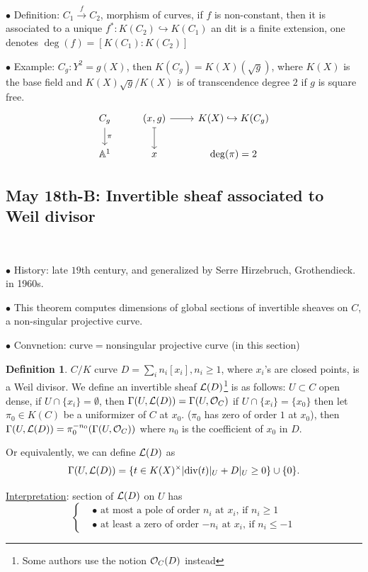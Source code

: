 \documentclass[11pt]{article}
\theoremstyle{definition}
\newtheorem{dfn}[thm]{Definition}
\newcommand{\affn}{\mathbb A}
\newcommand{\call}{{\cal L}}
\newcommand{\calo}{{\cal O}}
\renewcommand{\div}{\textnormal{div}}
\newcommand{\lrta}{\longrightarrow}
\newcommand{\inj}{\hookrightarrow}
\begin{document}
$\bullet$ Definition: $C_1\overset{f}{\lrta}{C_2}$, morphism of curves, if $f$ is non-constant, then it is associated to a unique $f^*:K(C_2)\inj K(C_1)$ an dit is a finite extension, one denotes $\deg(f)=[K(C_1):K(C_2)]$

$\bullet$ Example: $C_g:Y^2=g(X)$, then $K(C_g)=K(X)(\sqrt{g})$, where $K(X)$ is the base field and $K(X)\sqrt{g}/K(X)$ is of transcendence degree $2$ if $g$ is square free.
$$
\begin{tikzcd}
C_g \arrow[d, "\pi"] & {(x,g)} \arrow[d, maps to] \arrow[r] & K(X)\inj K(C_g) \\
\affn^1 & x & \deg(\pi)=2
\end{tikzcd}
$$
\subsection{May 18th-B: Invertible sheaf associated to Weil divisor}
\ 

$\bullet$ History: late $19$th century, and generalized by Serre Hirzebruch, Grothendieck. in 1960s.

$\bullet$ This theorem computes dimensions of global sections of invertible sheaves on $C$, a non-singular projective curve.

$\bullet$ Convnetion: curve$=$nonsingular projective curve (in this section)
\begin{dfn} $C/K$ curve $D=\sum_i n_i [x_i], n_i\geq 1$, where $x_i$'s are closed points,  is a Weil divisor.  We define an  invertible sheaf $\call(D)$\footnote{Some authors use the notion $\calo_C(D)$ instead} is as follows:
$U\subset C$ open dense, if $U\cap \{x_i\}=\emptyset$, then $\Gamma(U,\call(D))=\Gamma(U,\calo_C)$ if $U\cap \{x_i\}=\{x_0\}$ then let $\pi_0\in K(C)$  be a uniformizer of $C$ at $x_0$.  ($\pi_0$ has zero of order $1$ at $x_0$), then $\Gamma(U,\call(D))=\pi_0^{-n_0}(\Gamma(U,\calo_C))$ where $n_0$ is the coefficient of $x_0$ in $D$.

Or equivalently, we can define $\call(D)$ as
$$
\Gamma(U,\call(D))=\{t\in K(X)^\times| \div(t)|_U+D|_U \geq 0\}\cup \{0\}.
$$
\end{dfn}
\underline{Interpretation}: section of $\call(D)$ on $U$ has 
$$
\left\{
\begin{aligned}
&\bullet\text{ at most a pole of order $n_i$ at $x_i$, if $n_i\geq 1$}\\
&\bullet\text{ at least a zero of order $-n_i$ at $x_i$, if $n_i\leq -1$}
\end{aligned}\right.
$$
\end{document}
